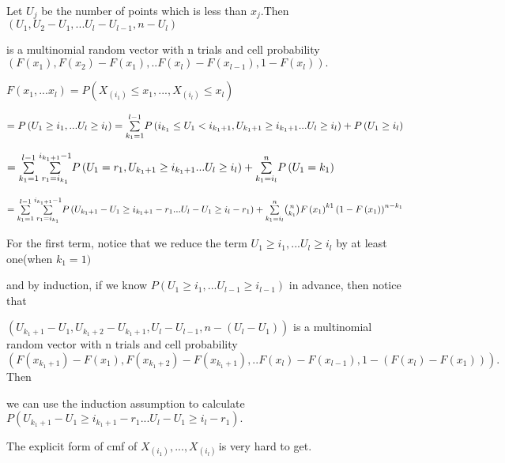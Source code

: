 \documentclass{article}
\def\QTP#1{}
\begin{document}
Let $U_{j}$ be the number of points which is less than $x_{j}.$Then $\left(
U_{1},U_{2}-U_{1},...U_{l}-U_{l-1},n-U_{l}\right) $

is a multinomial random vector with n trials and cell probability $\left(
F\left( x_{1}\right) ,F\left( x_{2}\right) -F\left( x_{1}\right) ,..F\left(
x_{l}\right) -F\left( x_{l-1}\right) ,1-F\left( x_{l}\right) \right) .$

$F\left( x_{1},...x_{l}\right) =P\left( X_{\left( i_{1}\right) }\leq
x_{1},...,X_{\left( i_{l}\right) }\leq x_{l}\right) $

$=P\left( U_{1}\geq i_{1},...U_{l}\geq i_{l}\right) =\overset{l-1}{\underset{%
k_{1}=1}{\sum }}P\left( i_{k_{1}}\leq U_{1}<i_{k_{1}+1},U_{k_{1}+1}\geq
i_{k_{1}+1}...U_{l}\geq i_{l}\right) +P\left( U_{1}\geq i_{l}\right) $

\QTP{Body Math}
$=\overset{l-1}{\underset{k_{1}=1}{\sum }}\overset{i_{k_{1}+1}-1}{\underset{%
r_{1}=i_{k_{1}}}{\sum }}P\left( U_{1}=r_{1},U_{k_{1}+1}\geq
i_{k_{1}+1}...U_{l}\geq i_{l}\right) +\overset{n}{\underset{k_{1}=i_{l}}{%
\sum }}P\left( U_{1}=k_{1}\right) $

\QTP{Body Math}
$=\overset{l-1}{\underset{k_{1}=1}{\sum }}\overset{i_{k_{1}+1}-1}{\underset{%
r_{1}=i_{k_{1}}}{\sum }}P\left( U_{k_{1}+1}-U_{1}\geq
i_{k_{1}+1}-r_{1}...U_{l}-U_{1}\geq i_{l}-r_{1}\right) +\overset{n}{\underset%
{k_{1}=i_{l}}{\sum }}\binom{n}{k_{1}}F\left( x_{1}\right) ^{k1}\left(
1-F\left( x_{1}\right) \right) ^{n-k_{1}}$

\bigskip 

For the first term, notice that we reduce the term $U_{1}\geq
i_{1},...U_{l}\geq i_{l}$ by at least one(when $k_{1}=1)$

and by induction, if we know $P\left( U_{1}\geq i_{1},...U_{l-1}\geq
i_{l-1}\right) $ in advance, then notice that 

$\left( U_{k_{1}+1}-U_{1},U_{k_{1}+2}-U_{k_{1}+1},U_{l}-U_{l-1},n-\left(
U_{l}-U_{1}\right) \right) $ is a multinomial random vector with n trials
and cell probability $\left( F\left( x_{k_{1}+1}\right) -F\left(
x_{1}\right) ,F\left( x_{k_{1}+2}\right) -F\left( x_{k_{1}+1}\right)
,..F\left( x_{l}\right) -F\left( x_{l-1}\right) ,1-\left( F\left(
x_{l}\right) -F\left( x_{1}\right) \right) \right) .$Then

we can use the induction assumption to calculate $P\left(
U_{k_{1}+1}-U_{1}\geq i_{k_{1}+1}-r_{1}...U_{l}-U_{1}\geq i_{l}-r_{1}\right)
.$

The explicit form of cmf of $X_{\left( i_{1}\right) },...,X_{\left(
i_{l}\right) \ }$is very hard to get.
\end{document}
